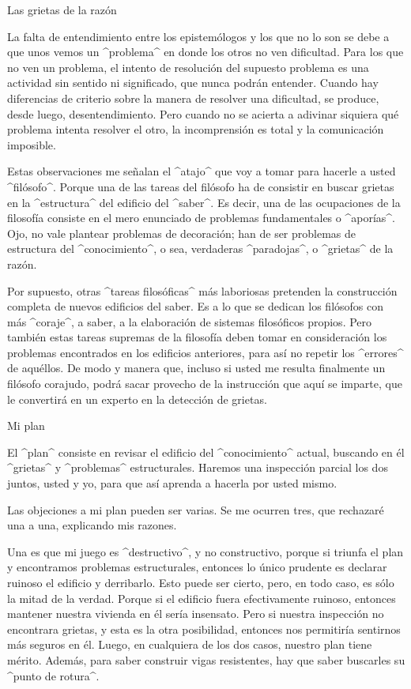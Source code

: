 \Section Las grietas de la razón

La falta de entendimiento entre los epistemólogos y los que no lo son se
debe a que unos vemos un ^problema^ en donde los otros no ven
dificultad. Para los que no ven un problema, el intento de resolución
del supuesto problema es una actividad sin sentido ni significado, que
nunca podrán entender. Cuando hay diferencias de criterio sobre la
manera de resolver una dificultad, se produce, desde luego,
desentendimiento. Pero cuando no se acierta a adivinar siquiera qué
problema intenta resolver el otro, la incomprensión es total y la
comunicación imposible.

Estas observaciones me señalan el ^atajo^ que voy a tomar para hacerle a
usted ^filósofo^. Porque una de las tareas del filósofo ha de consistir
en buscar grietas en la ^estructura^ del edificio del ^saber^. Es decir,
una de las ocupaciones de la filosofía consiste en el mero enunciado de
problemas fundamentales o ^aporías^. Ojo, no vale plantear problemas de
decoración; han de ser problemas de estructura del ^conocimiento^, o
sea, verdaderas ^paradojas^, o ^grietas^ de la razón.

Por supuesto, otras ^tareas filosóficas^ más laboriosas pretenden la
construcción completa de nuevos edificios del saber. Es a lo que se
dedican los filósofos con más ^coraje^, a saber, a la elaboración de
sistemas filosóficos propios. Pero también estas tareas supremas de la
filosofía deben tomar en consideración los problemas encontrados en los
edificios anteriores, para así no repetir los ^errores^ de aquéllos. De
modo y manera que, incluso si usted me resulta finalmente un filósofo
corajudo, podrá sacar provecho de la instrucción que aquí se imparte,
que le convertirá en un experto en la detección de grietas.


\Section Mi plan

El ^plan^ consiste en revisar el edificio del ^conocimiento^ actual,
buscando en él ^grietas^ y ^problemas^ estructurales. Haremos una
inspección parcial los dos juntos, usted y yo, para que así aprenda a
hacerla por usted mismo.

Las objeciones a mi plan pueden ser varias. Se me ocurren tres, que
rechazaré una a una, explicando mis razones.

Una es que mi juego es ^destructivo^, y no constructivo, porque si
triunfa el plan y encontramos problemas estructurales, entonces lo único
prudente es declarar ruinoso el edificio y derribarlo. Esto puede ser
cierto, pero, en todo caso, es sólo la mitad de la verdad. Porque si el
edificio fuera efectivamente ruinoso, entonces mantener nuestra vivienda
en él sería insensato. Pero si nuestra inspección no encontrara grietas,
y esta es la otra posibilidad, entonces nos permitiría sentirnos más
seguros en él. Luego, en cualquiera de los dos casos, nuestro plan tiene
mérito. Además, para saber construir vigas resistentes, hay que saber
buscarles su ^punto de rotura^.

